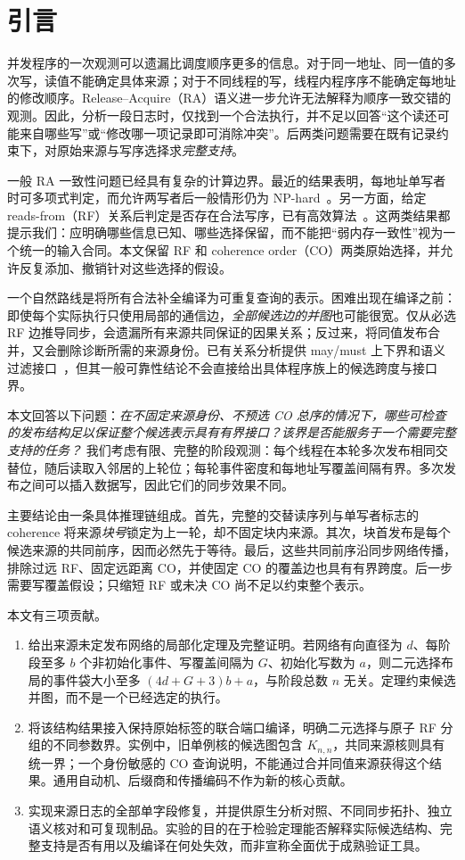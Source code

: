 \section{引言}
并发程序的一次观测可以遗漏比调度顺序更多的信息。对于同一地址、同一值的多次写，读值不能确定具体来源；对于不同线程的写，线程内程序序不能确定每地址的修改顺序。Release--Acquire（RA）语义进一步允许无法解释为顺序一致交错的观测。因此，分析一段日志时，仅找到一个合法执行，并不足以回答“这个读还可能来自哪些写”或“修改哪一项记录即可消除冲突”。后两类问题需要在既有记录约束下，对原始来源与写序选择求\emph{完整支持}。

一般 RA 一致性问题已经具有复杂的计算边界。最近的结果表明，每地址单写者时可多项式判定，而允许两写者后一般情形仍为 NP-hard~\cite{govind2026}。另一方面，给定 reads-from（RF）关系后判定是否存在合法写序，已有高效算法~\cite{tunc2023}。这两类结果都提示我们：应明确哪些信息已知、哪些选择保留，而不能把“弱内存一致性”视为一个统一的输入合同。本文保留 RF 和 coherence order（CO）两类原始选择，并允许反复添加、撤销针对这些选择的假设。

一个自然路线是将所有合法补全编译为可重复查询的表示。困难出现在编译之前：即使每个实际执行只使用局部的通信边，\emph{全部候选边的并图}也可能很宽。仅从必选 RF 边推导同步，会遗漏所有来源共同保证的因果关系；反过来，将同值发布合并，又会删除诊断所需的来源身份。已有关系分析提供 may/must 上下界和语义过滤接口~\cite{haas2023}，但其一般可靠性结论不会直接给出具体程序族上的候选跨度与接口界。

本文回答以下问题：\emph{在不固定来源身份、不预选 CO 总序的情况下，哪些可检查的发布结构足以保证整个候选表示具有有界接口？该界是否能服务于一个需要完整支持的任务？} 我们考虑有限、完整的阶段观测：每个线程在本轮多次发布相同交替位，随后读取入邻居的上轮位；每轮事件密度和每地址写覆盖间隔有界。多次发布之间可以插入数据写，因此它们的同步效果不同。

主要结论由一条具体推理链组成。首先，完整的交替读序列与单写者标志的 coherence 将来源\emph{块号}锁定为上一轮，却不固定块内来源。其次，块首发布是每个候选来源的共同前序，因而必然先于等待。最后，这些共同前序沿同步网络传播，排除过远 RF、固定远距离 CO，并使固定 CO 的覆盖边也具有有界跨度。后一步需要写覆盖假设；只缩短 RF 或未决 CO 尚不足以约束整个表示。

本文有三项贡献。
\begin{enumerate}
\item 给出来源未定发布网络的局部化定理及完整证明。若网络有向直径为 $d$、每阶段至多 $b$ 个非初始化事件、写覆盖间隔为 $G$、初始化写数为 $a$，则二元选择布局的事件袋大小至多 $(4d+G+3)b+a$，与阶段总数 $n$ 无关。定理约束候选并图，而不是一个已经选定的执行。
\item 将该结构结果接入保持原始标签的联合端口编译，明确二元选择与原子 RF 分组的不同参数界。实例中，旧单例核的候选图包含 $K_{n,n}$，共同来源核则具有统一界；一个身份敏感的 CO 查询说明，不能通过合并同值来源获得这个结果。通用自动机、后缀商和传播编码不作为新的核心贡献。
\item 实现来源日志的全部单字段修复，并提供原生分析对照、不同同步拓扑、独立语义核对和可复现制品。实验的目的在于检验定理能否解释实际候选结构、完整支持是否有用以及编译在何处失效，而非宣称全面优于成熟验证工具。
\end{enumerate}

